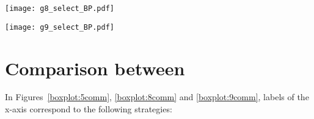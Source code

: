 \begin{minipage}[c]{0.45\textwidth}
\centering
\texttt{[image: g8\_select\_BP.pdf]}
\label{subfig:boxplot_sel8}
\end{minipage}\hspace{0.05\textwidth}
\begin{minipage}[c]{0.45\textwidth}
\centering
\texttt{[image: g9\_select\_BP.pdf]}
\label{subfig:boxplot_sel9}
\end{minipage}

\section{Comparison between \commstrs}

In Figures~\ref{boxplot:5comm}, \ref{boxplot:8comm} and \ref{boxplot:9comm}, labels of the x-axis correspond to the following strategies:


